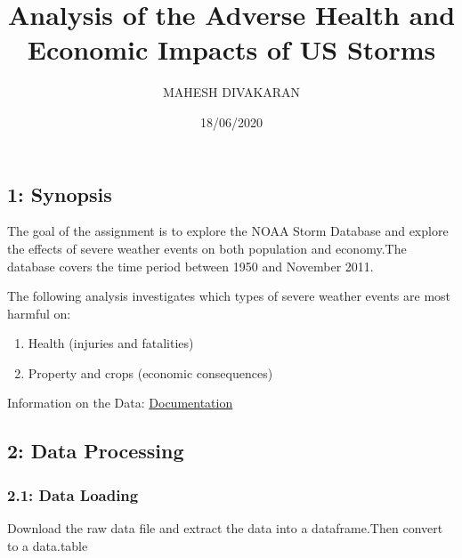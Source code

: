 \documentclass[
]{article}
\title{Analysis of the Adverse Health and Economic Impacts of US Storms}
\author{MAHESH DIVAKARAN}
\date{18/06/2020}
\newenvironment{Shaded}{\begin{snugshade}}{\end{snugshade}}
\newcommand{\CommentTok}[1]{\textcolor[rgb]{0.56,0.35,0.01}{\textit{#1}}}
\newcommand{\DataTypeTok}[1]{\textcolor[rgb]{0.13,0.29,0.53}{#1}}
\newcommand{\KeywordTok}[1]{\textcolor[rgb]{0.13,0.29,0.53}{\textbf{#1}}}
\newcommand{\NormalTok}[1]{#1}
\newcommand{\StringTok}[1]{\textcolor[rgb]{0.31,0.60,0.02}{#1}}
\providecommand{\tightlist}{%
  \setlength{\itemsep}{0pt}\setlength{\parskip}{0pt}}
\begin{document}
\maketitle

\hypertarget{synopsis}{%
\subsection{1: Synopsis}\label{synopsis}}

The goal of the assignment is to explore the NOAA Storm Database and
explore the effects of severe weather events on both population and
economy.The database covers the time period between 1950 and November
2011.

The following analysis investigates which types of severe weather events
are most harmful on:

\begin{enumerate}
\def\labelenumi{\arabic{enumi}.}
\tightlist
\item
  Health (injuries and fatalities)
\item
  Property and crops (economic consequences)
\end{enumerate}

Information on the Data:
\href{https://d396qusza40orc.cloudfront.net/repdata\%2Fpeer2_doc\%2Fpd01016005curr.pdf}{Documentation}

\hypertarget{data-processing}{%
\subsection{2: Data Processing}\label{data-processing}}

\hypertarget{data-loading}{%
\subsubsection{2.1: Data Loading}\label{data-loading}}

Download the raw data file and extract the data into a dataframe.Then
convert to a data.table

\begin{Shaded}
\end{Shaded}
\end{document}
